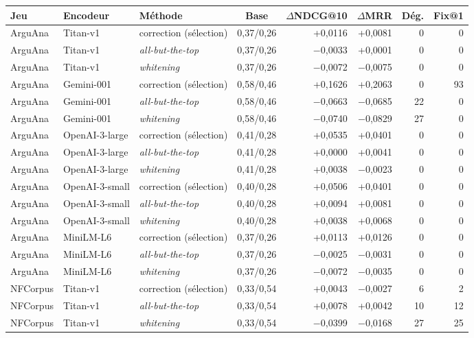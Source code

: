 \documentclass[a4paper,10pt]{article}
\begin{document}
\begin{table}[p]
\centering
\footnotesize
\begin{tabular}{lllcrrrr}
\toprule
Jeu & Encodeur & Méthode & Base & $\Delta$NDCG@10 & $\Delta$MRR & Dég. & Fix@1 \\
\midrule
ArguAna & Titan-v1 & correction (sélection) & 0,37/0,26 & +0,0116 & +0,0081 & 0 & 0 \\
ArguAna & Titan-v1 & \textit{all-but-the-top} & 0,37/0,26 & $-$0,0033 & +0,0001 & 0 & 0 \\
ArguAna & Titan-v1 & \textit{whitening} & 0,37/0,26 & $-$0,0072 & $-$0,0075 & 0 & 0 \\
ArguAna & Gemini-001 & correction (sélection) & 0,58/0,46 & +0,1626 & +0,2063 & 0 & 93 \\
ArguAna & Gemini-001 & \textit{all-but-the-top} & 0,58/0,46 & $-$0,0663 & $-$0,0685 & 22 & 0 \\
ArguAna & Gemini-001 & \textit{whitening} & 0,58/0,46 & $-$0,0740 & $-$0,0829 & 27 & 0 \\
ArguAna & OpenAI-3-large & correction (sélection) & 0,41/0,28 & +0,0535 & +0,0401 & 0 & 0 \\
ArguAna & OpenAI-3-large & \textit{all-but-the-top} & 0,41/0,28 & +0,0000 & +0,0041 & 0 & 0 \\
ArguAna & OpenAI-3-large & \textit{whitening} & 0,41/0,28 & +0,0038 & $-$0,0023 & 0 & 0 \\
ArguAna & OpenAI-3-small & correction (sélection) & 0,40/0,28 & +0,0506 & +0,0401 & 0 & 0 \\
ArguAna & OpenAI-3-small & \textit{all-but-the-top} & 0,40/0,28 & +0,0094 & +0,0081 & 0 & 0 \\
ArguAna & OpenAI-3-small & \textit{whitening} & 0,40/0,28 & +0,0038 & +0,0068 & 0 & 0 \\
ArguAna & MiniLM-L6 & correction (sélection) & 0,37/0,26 & +0,0113 & +0,0126 & 0 & 0 \\
ArguAna & MiniLM-L6 & \textit{all-but-the-top} & 0,37/0,26 & $-$0,0025 & $-$0,0031 & 0 & 0 \\
ArguAna & MiniLM-L6 & \textit{whitening} & 0,37/0,26 & $-$0,0072 & $-$0,0035 & 0 & 0 \\
\midrule
NFCorpus & Titan-v1 & correction (sélection) & 0,33/0,54 & +0,0043 & $-$0,0027 & 6 & 2 \\
NFCorpus & Titan-v1 & \textit{all-but-the-top} & 0,33/0,54 & +0,0078 & +0,0042 & 10 & 12 \\
NFCorpus & Titan-v1 & \textit{whitening} & 0,33/0,54 & $-$0,0399 & $-$0,0168 & 27 & 25 \\

\end{tabular}
\end{table}
\end{document}
